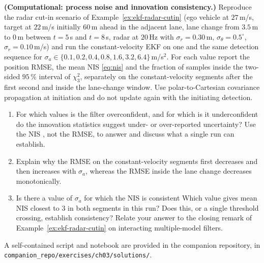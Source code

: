 \documentclass[graybox,envcountchap]{style/SNmono}
\newcommand{\repopath}[1]{\texttt{#1}}
\providecommand{\DIFadd}[1]{{\protect\color{blue} #1}} %
\providecommand{\DIFdel}[1]{{\protect\color{red} #1}} %
\providecommand{\DIFaddbegin}{} %
\providecommand{\DIFaddend}{} %
\providecommand{\DIFdelbegin}{} %
\providecommand{\DIFdelend}{} %
\begin{document}
\begin{prob}\label{prob:ch03:10}
\textbf{(Computational: process noise and innovation consistency.)} Reproduce the radar cut-in scenario of Example~\ref{ex:ekf-radar-cutin} (ego vehicle at $27$\,m/s, target at $22$\,m/s initially $60$\,m ahead in the adjacent lane, lane change from $3.5$\,m to $0$\,m between $t=5$\,s and $t=8$\,s, radar at $20$\,Hz with $\sigma_r=0.30$\,m, $\sigma_\theta=0.5^{\circ}$, $\sigma_{\dot r}=0.10$\,m/s) and run the constant-velocity EKF on one and the same detection sequence for $\sigma_a\in\{0.1,0.2,0.4,0.8,1.6,3.2,6.4\}$\,m/s$^{2}$. For each value report the position RMSE, the mean NIS \eqref{eq:nis} and the fraction of samples inside the two-sided $95\,\%$ interval of $\chi^{2}_{3}$, separately on the constant-velocity segments \DIFaddbegin \DIFadd{after the first second }\DIFaddend and inside the lane-change window. \DIFaddbegin \DIFadd{Use polar-to-Cartesian covariance propagation at initiation and do not update again with the initiating detection.
}\DIFaddend \begin{enumerate}
\item[(a)] For which values \DIFdelbegin \DIFdel{is the filter overconfident, and for which is it underconfident}\DIFdelend \DIFaddbegin \DIFadd{do the innovation statistics suggest under- or over-reported uncertainty}\DIFaddend ? Use the NIS \DIFdelbegin \DIFdel{, not the RMSE, to answer}\DIFdelend \DIFaddbegin \DIFadd{and discuss what a single run can establish}\DIFaddend .
\item[(b)] Explain why the RMSE on the constant-velocity segments first decreases and then increases with $\sigma_a$, whereas the RMSE inside the lane change decreases monotonically.
\item[(c)] \DIFdelbegin \DIFdel{Is there a value of $\sigma_a$ for which the NIS is consistent }\DIFdelend \DIFaddbegin \DIFadd{Which value gives mean NIS closest to $3$ }\DIFaddend in both segments \DIFaddbegin \DIFadd{in this run? Does this, or a single threshold crossing, establish consistency}\DIFaddend ? Relate your answer to the closing remark of Example~\ref{ex:ekf-radar-cutin} on interacting multiple-model filters.
\end{enumerate}
A self-contained script and notebook are provided in the companion repository, in \repopath{companion\_\allowbreak repo/\allowbreak exercises/\allowbreak ch03/\allowbreak solutions/}.
\end{prob}




\clearpage
\end{document}
